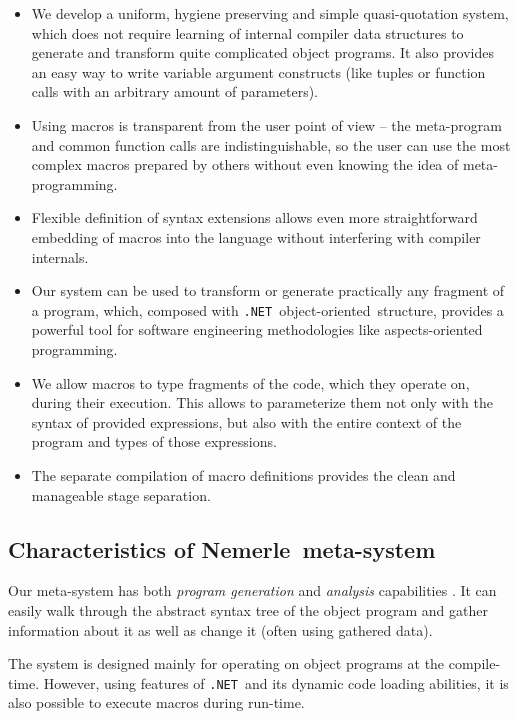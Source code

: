 \documentclass{llncs}
\newcommand{\net}[0]{{\tt .NET}}
\newcommand{\nem}[0]{Nemerle}
\newcommand{\oo}[0]{object-oriented}
\begin{document}
\begin{itemize}
  \item We develop a uniform, hygiene preserving and simple quasi-quotation system, 
    which does not require learning of internal compiler data structures to generate 
    and transform quite complicated object programs. It also provides an easy way to 
    write variable argument constructs (like tuples or function calls with an arbitrary 
    amount of parameters).
  \item Using macros is transparent from the user point of view -- the meta-program and 
    common function calls are indistinguishable, so the user can use the most complex
    macros prepared by others without even knowing the idea of meta-programming.
  \item Flexible definition of syntax extensions allows even more straightforward 
    embedding of macros into the language without interfering with compiler internals.
  \item Our system can be used to transform or generate practically any fragment
    of a program, which, composed with \net\ \oo\ structure, provides a powerful tool for
    software engineering methodologies like aspects-oriented programming.
  \item We allow macros to type fragments of the code, which they operate on, during
    their execution. This allows to parameterize them not only with the syntax of provided
    expressions, but also with the entire context of the program and types of those 
    expressions.
  \item The separate compilation of macro definitions provides the clean and manageable 
    stage separation.
\end{itemize}

\subsection{Characteristics of \nem\ meta-system}
Our meta-system has both \emph{program generation} and \emph{analysis}
capabilities \cite{Meta:Accomplishments}. It can easily walk through the abstract 
syntax tree of the object program and gather information about it as well 
as change it (often using gathered data).

The system is designed mainly for operating on object programs at the compile-time.
However, using features of \net\ and its dynamic code loading abilities, it is
also possible to execute macros during run-time. 
\end{document}
